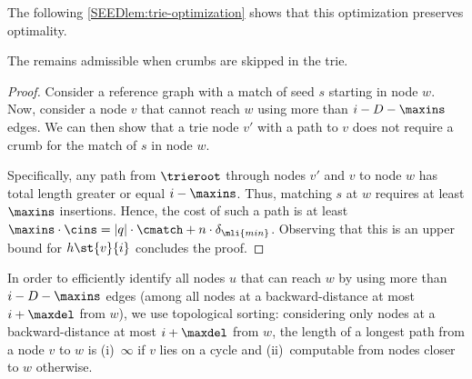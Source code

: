 The following \cref{SEEDlem:trie-optimization} shows that this optimization
preserves optimality.

\begin{lem}
	\label{SEEDlem:trie-optimization}
	The \seedh remains admissible when crumbs are skipped in the trie.
\end{lem}
\begin{proof}
	Consider a reference graph with a match of seed $s$ starting in node $w$.
	Now, consider a node $v$ that cannot reach $w$ using more than $i-D-\maxins$
	edges.
	We can then show that a trie node $v'$ with a path to $v$ does not require a
	crumb for the match of $s$ in node $w$.

	Specifically, any path from $\trieroot$ through nodes $v'$ and $v$ to node
	$w$ has total length greater or equal $i-\maxins$. Thus, matching $s$ at $w$
	requires at least $\maxins$ insertions. Hence, the cost of such a path is at
	least $\maxins \cdot \cins = |q| \cdot \cmatch + n \cdot
	\delta_{\mli{min}}$. Observing that this is an upper bound for $h\st{v}{i}$
	concludes the proof.
	\qedwhite
\end{proof}

In order to efficiently identify all nodes $u$ that can reach $w$ by using more
than $i-D-\maxins$ edges (among all nodes at a backward-distance at most
$i+\maxdel$ from $w$), we use topological sorting: considering only nodes at a
backward-distance at most $i+\maxdel$ from $w$, the length of a longest path
from a node $v$ to $w$ is (i)~$\infty$ if $v$ lies on a cycle and
(ii)~computable from nodes closer to $w$ otherwise.
